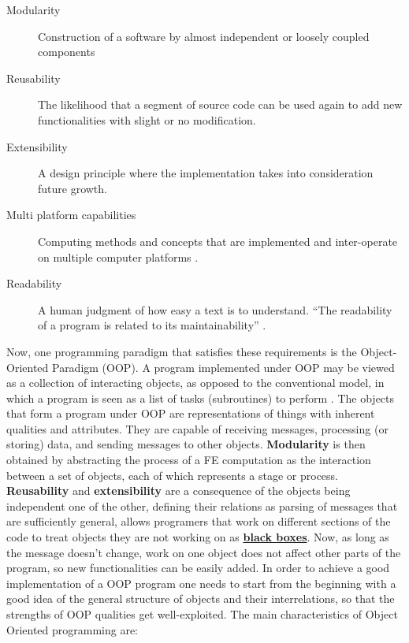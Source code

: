 \begin{description}
\item[Modularity] Construction of a software by almost independent or loosely coupled components \cite{Lage1998}
\item[Reusability]  The likelihood that a segment of source code can be used again to add new functionalities with slight or no modification. 
\item[Extensibility] A design principle where the implementation takes into consideration future growth.
\item [Multi platform capabilities]  Computing methods and concepts that are implemented and inter-operate on multiple computer platforms \cite{PCMag}.
\item[Readability]  A human judgment of how easy a
text is to understand. ``The readability of a program is related
to its maintainability'' \cite{Raymond2008}.
\end{description}

Now, one programming paradigm that satisfies these requirements is the Object-Oriented Paradigm (OOP). A program implemented under OOP may be viewed as a collection of interacting objects, as opposed to the conventional model, in which a program is seen as a list of tasks (subroutines) to perform \cite{Wikipedia2013}.
The objects that form a program under OOP are representations of things with inherent qualities and attributes. They are capable of receiving messages, processing (or storing) data, and sending messages to other objects. \textbf{Modularity} is then obtained by abstracting the process of a FE computation as the interaction between a set of objects, each of which represents a stage or process. \textbf{Reusability} and \textbf{extensibility} are a consequence of the objects being independent one of the other, defining their relations as parsing of messages that are sufficiently general, allows programers that work on different sections of the code to treat objects they are not working on as \href{http://en.wikipedia.org/wiki/Black_box}{\textbf{black boxes}}. Now, as long as the message doesn't change, work on one object does not affect other parts of the program, so new functionalities can be easily added. In order to achieve a good implementation of a OOP program one needs to start from the beginning with a good idea of the general structure of objects and their interrelations, so that the strengths of OOP qualities get well-exploited. 
The main characteristics of Object Oriented programming are:

